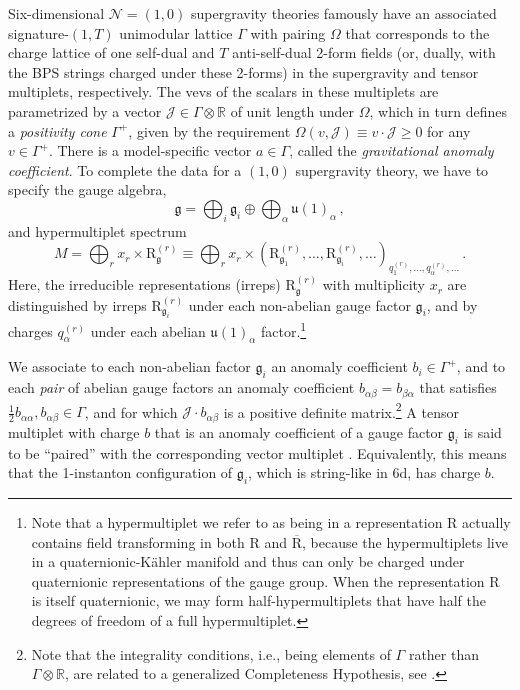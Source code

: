 \documentclass[11pt, a4paper]{article}
\newcommand*{\bbR}{\ensuremath{\mathbb{R}}}
\newcommand*{\cJ}{\ensuremath{\mathcal{J}}}
\newcommand*{\cN}{\ensuremath{\mathcal{N}}}
\newcommand*{\fkg}{\ensuremath{\mathfrak{g}}}
\newcommand*{\fku}{\ensuremath{\mathfrak{u}}}
\newcommand*{\irrep}[2]{\ensuremath{\bm{\mathrm{R}}_{#1}^{(#2)}}}
\newcommand*{\charge}[2]{\ensuremath{q_{#1}^{(#2)}}}
\newcommand*{\birrep}{\ensuremath{\bm{\mathrm{R}}}}
\begin{document}
Six-dimensional $\cN = (1, 0)$ supergravity theories famously have an associated signature-$(1,T)$ unimodular lattice $\Gamma$ with pairing $\Omega$ that corresponds to the charge lattice of one self-dual and $T$ anti-self-dual 2-form fields (or, dually, with the BPS strings charged under these 2-forms) in the supergravity and tensor multiplets, respectively.
The vevs of the scalars in these multiplets are parametrized by a vector $\cJ \in \Gamma \otimes \bbR$ of unit length under $\Omega$, which in turn defines a \emph{positivity cone} $\Gamma^+$, given by the requirement $\Omega(v, \cJ) \equiv v \cdot \cJ \ge 0$ for any $v \in \Gamma^+$.
There is a model-specific vector $a \in \Gamma$, called the \emph{gravitational anomaly coefficient}.
To complete the data for a $(1,0)$ supergravity theory, we have to specify the gauge algebra,
    \begin{equation}
        \fkg = \bigoplus_i \fkg_i \oplus \bigoplus_\alpha \fku(1)_\alpha\,,
    \end{equation}
and hypermultiplet spectrum
\begin{equation}\label{eq:hyper_total_rep}
    M = \bigoplus_r x_r \times \irrep{\fkg}{r} \equiv \bigoplus_r x_r \times (\irrep{\fkg_1}{r}, \dotsc, \irrep{\fkg_i}{r}, \dotsc)_{\charge{1}{r}, \dotsc, \charge{\alpha}{r}, \dotsc}\,.
\end{equation}
Here, the irreducible representations (irreps) $\irrep{\fkg}{r}$ with multiplicity $x_r$ are distinguished by irreps $\irrep{\fkg_i}{r}$ under each non-abelian gauge factor $\fkg_i$, and by charges $q_\alpha^{(r)}$ under each abelian $\fku(1)_\alpha$ factor.\footnote{Note that a hypermultiplet we refer to as being in a representation $\birrep$ actually contains field transforming in both $\birrep$ and $\overline{\birrep}$, because the hypermultiplets live in a quaternionic-K\"{a}hler manifold and thus can only be charged under quaternionic representations of the gauge group. When the representation $\birrep$ is itself quaternionic, we may form half-hypermultiplets that have half the degrees of freedom of a full hypermultiplet.\label{footnote_irreps}}


We associate to each non-abelian factor $\fkg_i$ an anomaly coefficient $b_i \in \Gamma^+$, and to each \emph{pair} of abelian gauge factors an anomaly coefficient $b_{\alpha \beta} = b_{\beta \alpha}$ that satisfies $\frac12 b_{\alpha \alpha}, b_{\alpha \beta} \in \Gamma$, and for which $\cJ \cdot b_{\alpha \beta}$ is a positive definite matrix.\footnote{Note that the integrality conditions, i.e., being elements of $\Gamma$ rather than $\Gamma \otimes \bbR$, are related to a generalized Completeness Hypothesis, see \cite{Monnier:2017oqd}.}
A tensor multiplet with charge $b$ that is an anomaly coefficient of a gauge factor $\fkg_i$ is said to be ``paired'' with the corresponding vector multiplet \cite{Morrison:2016djb}.
Equivalently, this means that the 1-instanton configuration of $\fkg_i$, which is string-like in 6d, has charge $b$.
\end{document}
